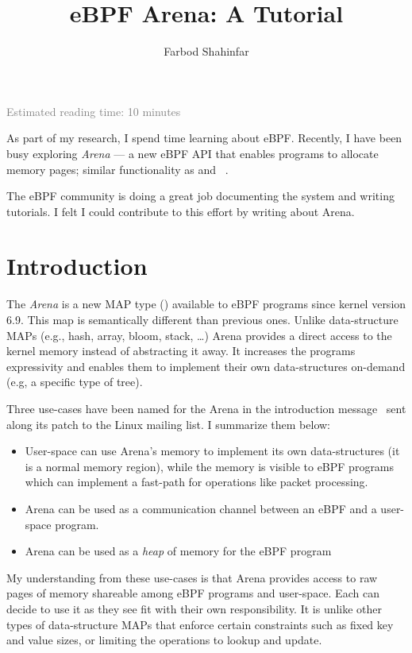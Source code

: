 \documentclass{article} \usepackage{graphicx}
\title{eBPF Arena: A Tutorial}
\author{Farbod Shahinfar}
\begin{document}
\maketitle
{
    \small \textcolor{gray}{Estimated reading time: 10 minutes}
}



As part of my research, I spend time learning about eBPF.
Recently, I have been busy exploring \emph{Arena} --- a new eBPF API that
enables programs to allocate memory pages; similar functionality as 
and ~\cite{arenapatch}.

The eBPF community is doing a great job documenting the system and writing
tutorials. I felt I could contribute to this effort by writing about Arena.


\section{Introduction}

The \emph{Arena} is a new MAP type () available to eBPF programs
since kernel version 6.9.
This map is semantically different than previous ones.
Unlike data-structure MAPs (e.g., hash, array, bloom, stack, \dots{}) Arena
provides a direct access to the kernel memory instead of abstracting it away.
It increases the programs expressivity and enables them to implement their own
data-structures on-demand (e.g, a specific type of tree).

Three use-cases have been named for the Arena in the introduction
message~\cite{arenapatch} sent along its patch to the Linux mailing list. I
summarize them below:
\begin{itemize}
    \item User-space can use Arena's memory to implement its own
        data-structures (it is a normal memory region), while the memory is
        visible to eBPF programs which can implement a fast-path for operations
        like packet processing.
    \item Arena can be used as a communication channel between an eBPF and a
        user-space program.
    \item Arena can be used as a \emph{heap} of memory for the eBPF program
\end{itemize}
My understanding from these use-cases is that Arena provides access to raw
pages of memory shareable among eBPF programs and user-space. Each can decide
to use it as they see fit with their own responsibility. It is unlike other
types of data-structure MAPs that enforce certain constraints such as fixed key
and value sizes, or limiting the operations to lookup and update.
\end{document}
